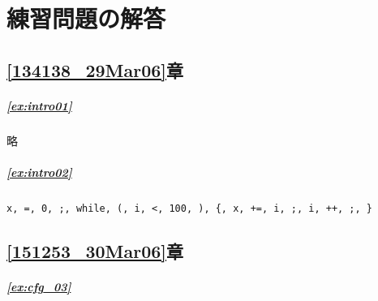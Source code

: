 
\chapter*{練習問題の解答}

\section*{\ref{134138_29Mar06}章}

\paragraph{\ref{ex:intro01}}

略

\paragraph{\ref{ex:intro02}}

\verb|x, =, 0, ;, while, (, i, <, 100, ), {, x, +=, i, ;, i, ++, ;, }|

\section*{\ref{151253_30Mar06}章}

\paragraph{\ref{ex:cfg_03}}


